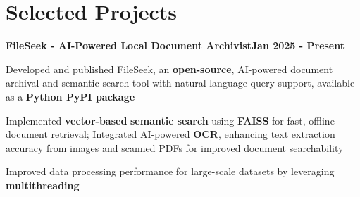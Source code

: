\documentclass[letterpaper,10pt]{article}
\newcommand{\heading}[2]{
  \hspace{10pt}#1\hfill#2\\
}
\newcommand{\headingBf}[2]{
  \heading{\textbf{#1}}{\textbf{#2}}
}
\newenvironment{resume_list}{
  \vspace{-7pt}
  \begin{itemize}[itemsep=-2px, parsep=1pt, leftmargin=30pt]
}{
  \end{itemize}
}
\begin{document}
  \section{Selected Projects}
  \headingBf{FileSeek - AI-Powered Local Document Archivist}{Jan 2025 - Present}
  \begin{resume_list}
      \item Developed and published FileSeek, an \textbf{open-source}, AI-powered document archival and semantic search tool with natural language query support, available as a \textbf{Python PyPI package}
      \item Implemented \textbf{vector-based} \textbf{semantic search} using \textbf{FAISS} for fast, offline document retrieval; Integrated AI-powered \textbf{OCR}, enhancing text extraction accuracy from images and scanned PDFs for improved document searchability
      \item Improved data processing performance for large-scale datasets by leveraging \textbf{multithreading}
  \end{resume_list}
  
\end{document}
